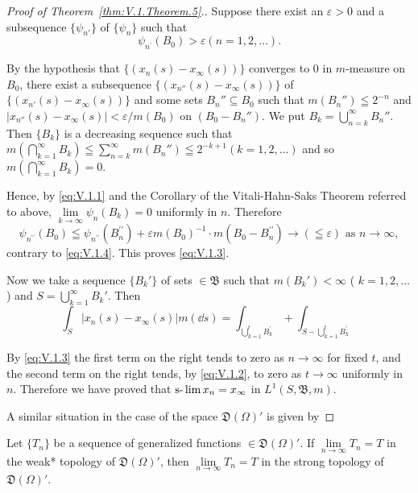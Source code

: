 \begin{proof}[Proof of Theorem~\ref{thm:V.1.Theorem.5}.]
Suppose there exist an $\varepsilon > 0$ and a subsequence $\{\psi_{n'}\}$ of $\{\psi_n\}$ such that 
\begin{equation}\label{eq:V.1.4}
\psi_ {n ^{\prime}} (B _{0}) > \varepsilon (n = 1, 2, \dots).
\end{equation}

By the hypothesis that $\{(x_n(s) - x_{\infty}(s))\}$ converges to $0$ in $m$-measure on $B_0$, there exist a subsequence $\{(x_{n''}(s) - x_{\infty}(s))\}$ of $\{(x_{n'}(s) - x_{\infty}(s))\}$ and some sets $B_n'' \subseteq B_0$ such that $m(B_n'') \leqq 2^{-n}$ and $|x_{n''}(s) - x_{\infty}(s)| < \varepsilon / m(B_0)$ on $(B_0 - B_n'')$. We put $B_k = \bigcup\limits_{n=k}^{\infty} B_n''$. Then $\{B_k\}$ is a decreasing sequence such that 
$m\left(\bigcap\limits_{k=1}^{\infty} B_k\right) \leqq \sum\limits_{n=k}^{\infty} m(B_n'') \leqq 2^{-k+1} (k=1, 2, \ldots)$ and so $m\left(\bigcap\limits_{k=1}^{\infty} B_k\right) = 0$. 

Hence, by \eqref{eq:V.1.1} and the Corollary of the Vitali-Hahn-Saks Theorem referred to above, $\lim\limits_{k\to \infty}\psi_n(B_k) = 0$ uniformly in $n$. Therefore 
\[
\psi_ {n ^{\prime \prime}} (B _{0}) \leqq \psi_ {n ^{\prime \prime}} (B _{n} ^{\prime \prime}) + \varepsilon m (B _{0}) ^{-1} \cdot m (B _{0} - B _{n} ^{\prime \prime}) \rightarrow (\leqq \varepsilon) \text{ as } n \rightarrow \infty ,
\]
contrary to \eqref{eq:V.1.4}. This proves \eqref{eq:V.1.3}. 

Now we take a sequence $\{B_k'\}$ of sets $\in \mathfrak{B}$ such that $m(B_k') < \infty$ ( $k = 1, 2, \ldots$) and $S = \bigcup\limits_{k=1}^{\infty} B_k'$. Then 
\[
\int_{S} \left| x _{n} (s) - x _{\infty} (s) \right| m (\dd s) = \int_ {\bigcup\limits_{k=1} ^{t} B _{k} ^{\prime}} + \int_ {S - \bigcup\limits_{k=1} ^{t} B _{k} ^{\prime}}
\]

By \eqref{eq:V.1.3} the first term on the right tends to zero as $n \to \infty$ for fixed $t$, and the second term on the right tends, by \eqref{eq:V.1.2}, to zero as $t \to \infty$ uniformly in $n$. Therefore we have proved that $\text{s-}\lim x_n = x_\infty$ in $L^1(S, \mathfrak{B}, m)$. 

A similar situation in the case of the space $\mathfrak{D}(\Omega)'$ is given by 
\end{proof}

\begin{theorem}\label{thm:V.1.Theorem.6} Let $\{T_n\}$ be a sequence of generalized functions $\in \mathfrak{D}(\Omega)'$. If $\lim\limits_{n\to \infty}T_n = T$ in the weak* topology of $\mathfrak{D}(\Omega)'$, then $\lim\limits_{n\to \infty}T_n = T$ in the strong topology of $\mathfrak{D}(\Omega)'$. 
\end{theorem}

